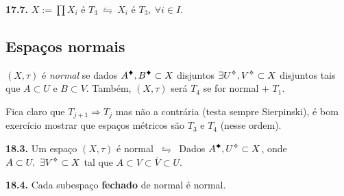 \begin{corollary}
    \textbf{17.7.} \(X:= \prod X_i\) é \(T_3 \ \leftrightharpoons \ X_i\) é \(T_3, \ \forall i \in I\). 
\end{corollary}

\subsection*{Espaços normais}

\begin{definition}
    \((X,\tau)\) é \emph{normal} se dados \(A\ce, B\ce \subset X\) disjuntos \(\exists U\ab, V\ab \subset X \) disjuntos tais que \( A \subset U\) e \(B \subset V\). Também, \((X, \tau)\) será \(T_4\) se for normal + \(T_1\). 
\end{definition}

\begin{note}
    Fica claro que \(T_{j+1} \Rightarrow T_j\) mas não a contrária (testa sempre Sierpinski), é bom exercício mostrar que espaços métricos são \(T_3\) e \(T_4\) (nesse ordem). 
\end{note}

\begin{proposition}
    \textbf{18.3.} Um espaço  \((X,\tau)\) é normal \(\ \leftrightharpoons \ \) Dados \(A\ce, U\ab \subset X\), onde \(A \subset U ,\ \exists V\ab\subset X\) tal que \( A \subset V \subset \overline{V} \subset U\). 
\end{proposition}


\hypertarget{prop184}{}
\begin{proposition}
    \textbf{18.4.} Cada subespaço \textbf{fechado} de normal é normal.  %
\end{proposition}

